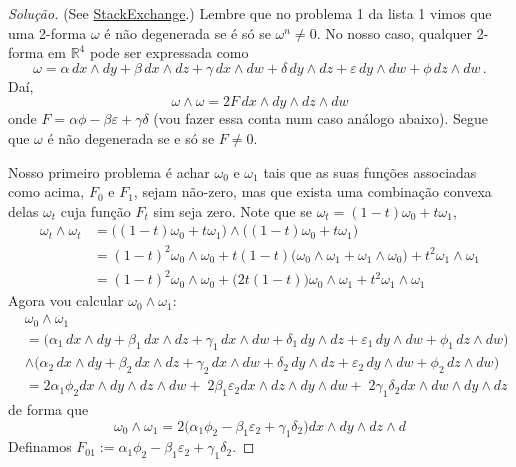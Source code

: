 \begin{proof}[Solução]\leavevmode
	{\color{2} (See \href{https://math.stackexchange.com/questions/2864834/non-linear-path-between-symplectic-forms-in-mathbbr4}{StackExchange}.)}\hspace{1em} Lembre que no problema 1 da lista 1 vimos que uma 2-forma $\omega$ é não degenerada se é só se $\omega^n\neq 0$. No nosso caso, qualquer 2-forma em $\mathbb{R}^{4}$ pode ser expressada como
	\[\omega = \alpha \, dx \wedge dy + \beta \, dx \wedge dz + \gamma \, dx \wedge dw + \delta \, dy \wedge dz + \varepsilon \, dy \wedge dw + \phi \, dz \wedge dw \, .\]
	Daí,
	\[\omega \wedge \omega =2 F \, dx \wedge dy \wedge dz \wedge dw\]
	onde $F = \alpha \phi - \beta \varepsilon + \gamma \delta$ (vou fazer essa conta num caso análogo abaixo). Segue que $\omega$ é não degenerada se e só se $F\neq 0$.

	Nosso primeiro problema é achar $\omega_0$ e $\omega_1$ tais que as suas funções associadas como acima, $F_0$ e $F_1$, sejam não-zero, mas que exista uma combinação convexa delas $\omega_t$ cuja função $F_t$ sim seja zero. Note que se $\omega_t=(1-t)\omega_0+t\omega_1$,
\begin{align*}
	\omega_t\wedge \omega_t&=\Big( (1-t)\omega_0+t\omega_1 \Big) \wedge \Big( (1-t)\omega_0+t \omega_1 \Big) \\
	&=(1-t)^2\omega_0\wedge \omega_0 +t(1-t)\Big(\omega_0\wedge \omega_1+\omega_1\wedge \omega_0\Big)+t^2\omega_1\wedge \omega_1\\
	&=(1-t)^2\omega_0\wedge \omega_0+\Big(2t(1-t)\Big)\omega_0\wedge \omega_1+t^2\omega_1\wedge \omega_1
\end{align*}
Agora vou calcular $\omega_0\wedge \omega_1$:
\begin{align*}
	&\omega_0\wedge \omega_1\\
	&=\Big( \alpha_1 \, dx \wedge dy + \beta_1 \, dx \wedge dz + \gamma_1 \, dx \wedge dw + \delta_1 \, dy \wedge dz + \varepsilon_1 \, dy \wedge dw + \phi_1 \, dz \wedge dw \Big)\\
	&\wedge \Big( \alpha_2 \, dx \wedge dy + \beta_2 \, dx \wedge dz + \gamma_2 \, dx \wedge dw + \delta_2 \, dy \wedge dz + \varepsilon_2 \, dy \wedge dw + \phi_2 \, dz \wedge dw \Big) \\
	&= 2\alpha_1 \phi_2dx\wedge dy\wedge dz\wedge dw+\;2\beta_1\varepsilon_2 dx\wedge dz\wedge dy\wedge dw+\; 2\gamma_1\delta_2dx\wedge dw \wedge dy\wedge dz
\end{align*}
de forma que
\[\omega_0\wedge \omega_1=2\Big(\alpha_1\phi_2-\beta_1 \varepsilon_2+\gamma_1 \delta_2\Big)dx\wedge dy\wedge dz\wedge d\]
Definamos $F_{01}:=\alpha_1\phi_2-\beta_1 \varepsilon_2+\gamma_1 \delta_2$.


\end{proof}
